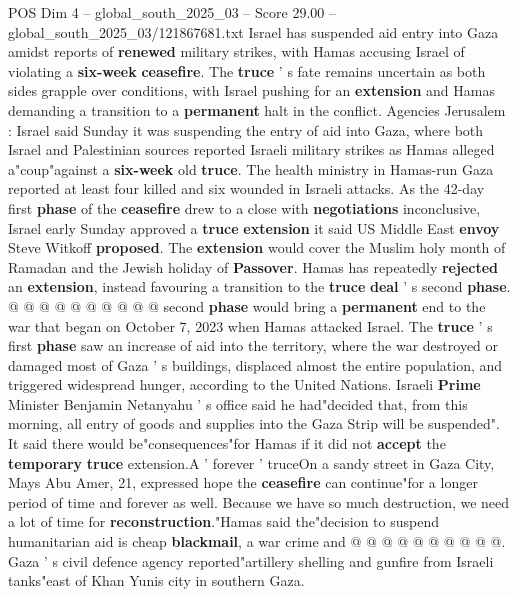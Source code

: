 \begin{textsample}{POS Dim 4 – global\_south\_2025\_03 – Score 29.00 – global\_south\_2025\_03/121867681.txt}  \label{ex:f4_pos_038}
Israel has suspended aid entry into Gaza amidst reports of \textbf{renewed} military strikes, with Hamas accusing Israel of violating a \textbf{six-week} \textbf{ceasefire}.
The \textbf{truce} ' s fate remains uncertain as both sides grapple over conditions, with Israel pushing for an \textbf{extension} and Hamas demanding a transition to a \textbf{permanent} halt in the conflict.
Agencies Jerusalem : Israel said Sunday it was suspending the entry of aid into Gaza, where both Israel and Palestinian sources reported Israeli military strikes as Hamas alleged a"coup"against a \textbf{six-week} old \textbf{truce}.
The health ministry in Hamas-run Gaza reported at least four killed and six wounded in Israeli attacks.
As the 42-day first \textbf{phase} of the \textbf{ceasefire} drew to a close with \textbf{negotiations} inconclusive, Israel early Sunday approved a \textbf{truce} \textbf{extension} it said US Middle East \textbf{envoy} Steve Witkoff \textbf{proposed}.
The \textbf{extension} would cover the Muslim holy month of Ramadan and the Jewish holiday of \textbf{Passover}.
Hamas has repeatedly \textbf{rejected} an \textbf{extension}, instead favouring a transition to the \textbf{truce} \textbf{deal} ' s second \textbf{phase}. @ @ @ @ @ @ @ @ @ @ second \textbf{phase} would bring a \textbf{permanent} end to the war that began on October 7, 2023 when Hamas attacked Israel.
The \textbf{truce} ' s first \textbf{phase} saw an increase of aid into the territory, where the war destroyed or damaged most of Gaza ' s buildings, displaced almost the entire population, and triggered widespread hunger, according to the United Nations.
Israeli \textbf{Prime} Minister Benjamin Netanyahu ' s office said he had"decided that, from this morning, all entry of goods and supplies into the Gaza Strip will be suspended".
It said there would be"consequences"for Hamas if it did not \textbf{accept} the \textbf{temporary} \textbf{truce} extension.A ' forever ' truceOn a sandy street in Gaza City, Mays Abu Amer, 21, expressed hope the \textbf{ceasefire} can continue"for a longer period of time and forever as well.
Because we have so much destruction, we need a lot of time for \textbf{reconstruction}."Hamas said the"decision to suspend humanitarian aid is cheap \textbf{blackmail}, a war crime and @ @ @ @ @ @ @ @ @ @.
Gaza ' s civil defence agency reported"artillery shelling and gunfire from Israeli tanks"east of Khan Yunis city in southern Gaza.

\end{textsample}
